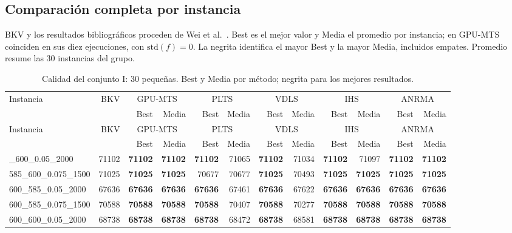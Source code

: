 \begin{landscape}
\setlength{\LTcapwidth}{\linewidth}
\section{Comparación completa por instancia}
\label{app:full-results}
{BKV y los resultados bibliográficos proceden de Wei et al.~\cite{Wei2026ANRMA}. Best es el mejor valor y Media el promedio por instancia; en GPU-MTS coinciden en sus diez ejecuciones, con $\mathrm{std}(f)=0$. La negrita identifica el mayor Best y la mayor Media, incluidos empates. Promedio resume las 30 instancias del grupo.}
\begingroup\footnotesize\setlength{\tabcolsep}{2.5pt}\renewcommand{\arraystretch}{.88}
\begin{longtable}{lrrrrrrrrrrr}
\caption{{Calidad del conjunto I: 30 pequeñas. Best y Media por método; negrita para los mejores resultados.}}\label{tab:full-c1}\\
\toprule
Instancia & BKV & \multicolumn{2}{c}{GPU-MTS} & \multicolumn{2}{c}{PLTS} & \multicolumn{2}{c}{VDLS} & \multicolumn{2}{c}{IHS} & \multicolumn{2}{c}{ANRMA}\\
 &  & Best & Media & Best & Media & Best & Media & Best & Media & Best & Media\\
\midrule\endfirsthead
Instancia & BKV & \multicolumn{2}{c}{GPU-MTS} & \multicolumn{2}{c}{PLTS} & \multicolumn{2}{c}{VDLS} & \multicolumn{2}{c}{IHS} & \multicolumn{2}{c}{ANRMA}\\
 &  & Best & Media & Best & Media & Best & Media & Best & Media & Best & Media\\
\midrule\endhead
\bottomrule\endlastfoot
585\_600\_0.05\_2000 & 71102 & \textbf{71102} & \textbf{71102} & \textbf{71102} & 71065 & \textbf{71102} & 71034 & \textbf{71102} & 71097 & \textbf{71102} & \textbf{71102}\\
585\_600\_0.075\_1500 & 71025 & \textbf{71025} & \textbf{71025} & 70677 & 70677 & \textbf{71025} & 70493 & \textbf{71025} & \textbf{71025} & \textbf{71025} & \textbf{71025}\\
600\_585\_0.05\_2000 & 67636 & \textbf{67636} & \textbf{67636} & \textbf{67636} & 67461 & \textbf{67636} & 67622 & \textbf{67636} & \textbf{67636} & \textbf{67636} & \textbf{67636}\\
600\_585\_0.075\_1500 & 70588 & \textbf{70588} & \textbf{70588} & \textbf{70588} & 70407 & \textbf{70588} & 70277 & \textbf{70588} & \textbf{70588} & \textbf{70588} & \textbf{70588}\\
600\_600\_0.05\_2000 & 68738 & \textbf{68738} & \textbf{68738} & \textbf{68738} & 68472 & \textbf{68738} & 68581 & \textbf{68738} & \textbf{68738} & \textbf{68738} & \textbf{68738}\\

\end{longtable}
\end{landscape}
